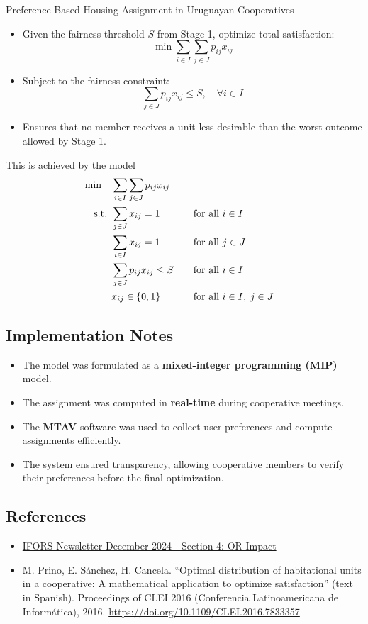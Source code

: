 \begin{casestudybox}{Preference-Based Housing Assignment in Uruguayan Cooperatives}
\begin{itemize}
    \item Given the fairness threshold $S$ from Stage 1, optimize total satisfaction:
    \[ \min \sum_{i \in I} \sum_{j \in J} p_{ij} x_{ij} \]
    \item Subject to the fairness constraint:
    \[ \sum_{j \in J} p_{ij} x_{ij} \leq S, \quad \forall i \in I \]
    \item Ensures that no member receives a unit less desirable than the worst outcome allowed by Stage 1.
\end{itemize}
This is achieved by the model
\begin{align*}
\min \quad & \sum_{i \in I} \sum_{j \in J} p_{i j} x_{i j} \\
\text{ s.t. }        & \sum_{j \in J} x_{i j} = 1 &&\quad \text{for all } i \in I \\
                 & \sum_{i \in I} x_{i j} = 1 &&\quad \text{for all } j \in J \\
                 & \sum_{j \in J} p_{i j} x_{i j} \leq S &&\quad \text{for all } i \in I \\
                 & x_{i j} \in \{0,1\} &&\quad \text{for all } i \in I, \; j \in J
\end{align*}

\subsection*{Implementation Notes}

\begin{itemize}
    \item The model was formulated as a \textbf{mixed-integer programming (MIP)} model.
    \item The assignment was computed in \textbf{real-time} during cooperative meetings.
    \item The \textbf{MTAV} software was used to collect user preferences and compute assignments efficiently.
    \item The system ensured transparency, allowing cooperative members to verify their preferences before the final optimization.
\end{itemize}

\subsection*{References}
\begin{itemize}
\item \href{https://ifors.org/newsletter/ifors-news-dec-2024.pdf}{IFORS Newsletter December 2024 -  Section 4: OR Impact}
\item  M. Prino, E. Sánchez, H. Cancela. “Optimal distribution of habitational units in a cooperative: A mathematical application to optimize satisfaction” (text in Spanish). Proceedings of CLEI 2016 (Conferencia Latinoamericana de Informática), 2016. \url{https://doi.org/10.1109/CLEI.2016.7833357}
\end{itemize}

\end{casestudybox}

